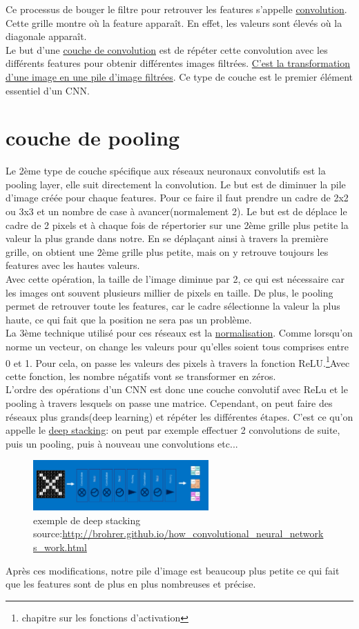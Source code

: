 \documentclass[openany,14pt,fleqn]{book} %
\begin{document}
Ce processus de bouger le filtre pour retrouver les features s'appelle \underline{convolution}.
Cette grille montre où la feature apparaît. En effet, les valeurs sont élevés où la diagonale apparaît.\\
Le but d'une \underline{couche de convolution} est de répéter cette convolution avec les différents features pour obtenir différentes images filtrées. \underline{C'est la transformation d'une image en une pile d'image filtrées}. Ce type de couche est le premier élément essentiel d'un CNN.\\
\section{couche de pooling}
Le 2ème type de couche spécifique aux réseaux neuronaux convolutifs est la pooling layer, elle suit directement la convolution. Le but est de diminuer la pile d'image créée pour chaque features. Pour ce faire il faut prendre un cadre de 2x2 ou 3x3 et un nombre de case à avancer(normalement 2). Le but est de déplace le cadre de 2 pixels et à chaque fois de répertorier sur une 2ème grille plus petite la valeur la plus grande dans notre. En se déplaçant ainsi à travers la première grille, on obtient une 2ème grille plus petite, mais on y retrouve toujours les features avec les hautes valeurs.\\ Avec cette opération, la taille de l'image diminue par 2, ce qui est nécessaire car les images ont souvent plusieurs millier de pixels en taille. De plus, le pooling permet de retrouver toute les features, car le cadre sélectionne la valeur la plus haute, ce qui fait que la position ne sera pas un problème.\\
La 3ème technique utilisé pour ces réseaux est la  \underline{normalisation}. Comme lorsqu'on norme un vecteur, on change les valeurs pour qu'elles soient tous comprises entre 0 et 1. Pour cela, on passe les valeurs des pixels à travers la fonction ReLU.\footnote{ chapitre sur les fonctions d'activation}Avec cette fonction, les nombre négatifs vont se transformer en zéros.\\
L'ordre des opérations d'un CNN est donc une couche convolutif avec ReLu et le pooling à travers lesquels on passe une matrice. Cependant, on peut faire des réseaux plus grands(deep learning) et répéter les différentes étapes. C'est ce qu'on appelle le \underline{deep stacking}: on peut par exemple effectuer 2 convolutions de suite, puis un pooling, puis à nouveau une convolutions etc...
\begin{figure}[h]
\centering\includegraphics[width=0.6\textwidth]{Pictures/cnn12__1_.png}
\caption{exemple de deep stacking source:\url{http://brohrer.github.io/how_convolutional_neural_networks_work.html}}
\end{figure}
Après ces modifications, notre pile d'image est beaucoup plus petite ce qui fait que les features sont de plus en plus nombreuses et précise.\\
\end{document}
